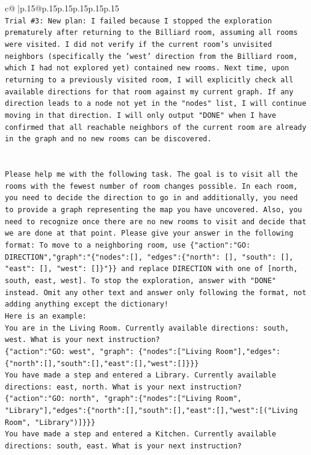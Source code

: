 \documentclass{article}
\begin{document}
{\begin{supertabular}{c@{$\;$}|p{.15\linewidth}@{}p{.15\linewidth}p{.15\linewidth}p{.15\linewidth}p{.15\linewidth}p{.15\linewidth}}
{{{\\ 
\texttt{Trial \#3: New plan: I failed because I stopped the exploration prematurely after returning to the Billiard room, assuming all rooms were visited. I did not verify if the current room's unvisited neighbors (specifically the 'west' direction from the Billiard room, which I had not explored yet) contained new rooms. Next time, upon returning to a previously visited room, I will explicitly check all available directions for that room against my current graph. If any direction leads to a node not yet in the "nodes" list, I will continue moving in that direction. I will only output "DONE" when I have confirmed that all reachable neighbors of the current room are already in the graph and no new rooms can be discovered.} \\
\\ 
\\ 
\texttt{Please help me with the following task. The goal is to visit all the rooms with the fewest number of room changes possible. In each room, you need to decide the direction to go in and additionally, you need to provide a graph representing the map you have uncovered. Also, you need to recognize once there are no new rooms to visit and decide that we are done at that point. Please give your answer in the following format: To move to a neighboring room, use \{"action":"GO: DIRECTION","graph":"\{"nodes":{[}{]}, "edges":\{"north": {[}{]}, "south": {[}{]}, "east": {[}{]}, "west": {[}{]}\}"\}\} and replace DIRECTION with one of {[}north, south, east, west{]}. To stop the exploration, answer with "DONE" instead. Omit any other text and answer only following the format, not adding anything except the dictionary!} \\
\texttt{Here is an example: } \\
\texttt{You are in the Living Room. Currently available directions: south, west. What is your next instruction?} \\
\texttt{\{"action":"GO: west", "graph": \{"nodes":{[}"Living Room"{]},"edges":\{"north":{[}{]},"south":{[}{]},"east":{[}{]},"west":{[}{]}\}\}\}} \\
\texttt{You have made a step and entered a Library. Currently available directions: east, north. What is your next instruction?} \\
\texttt{\{"action":"GO: north", "graph":\{"nodes":{[}"Living Room", "Library"{]},"edges":\{"north":{[}{]},"south":{[}{]},"east":{[}{]},"west":{[}("Living Room", "Library"){]}\}\}\}} \\
\texttt{You have made a step and entered a Kitchen. Currently available directions: south, east. What is your next instruction?} \\
}}}
\end{supertabular}}
\end{document}
